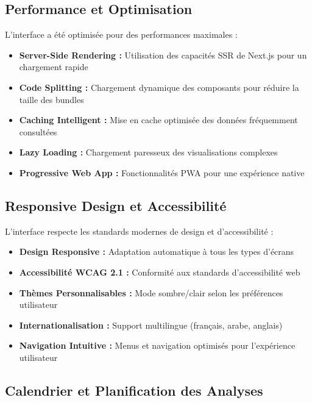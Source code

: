 \subsection{Performance et Optimisation}

L'interface a été optimisée pour des performances maximales :

\begin{itemize}
    \item \textbf{Server-Side Rendering :} Utilisation des capacités SSR de Next.js pour un chargement rapide
    \item \textbf{Code Splitting :} Chargement dynamique des composants pour réduire la taille des bundles
    \item \textbf{Caching Intelligent :} Mise en cache optimisée des données fréquemment consultées
    \item \textbf{Lazy Loading :} Chargement paresseux des visualisations complexes
    \item \textbf{Progressive Web App :} Fonctionnalités PWA pour une expérience native
\end{itemize}

\subsection{Responsive Design et Accessibilité}

L'interface respecte les standards modernes de design et d'accessibilité :

\begin{itemize}
    \item \textbf{Design Responsive :} Adaptation automatique à tous les types d'écrans
    \item \textbf{Accessibilité WCAG 2.1 :} Conformité aux standards d'accessibilité web
    \item \textbf{Thèmes Personnalisables :} Mode sombre/clair selon les préférences utilisateur
    \item \textbf{Internationalisation :} Support multilingue (français, arabe, anglais)
    \item \textbf{Navigation Intuitive :} Menus et navigation optimisés pour l'expérience utilisateur
\end{itemize}

\subsection{Calendrier et Planification des Analyses}


